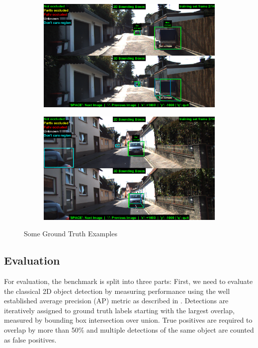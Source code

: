 \begin{figure}[h]
\begin{subfigure}{.5\textwidth}
\end{subfigure}
\begin{subfigure}{.5\textwidth}
    \centering
    \includegraphics[width=1.0\linewidth]{img/matlab/d3.png}
\end{subfigure}%
\begin{subfigure}{.5\textwidth}
    \centering
    \includegraphics[width=1.0\linewidth]{img/matlab/d4.png}
\end{subfigure}
\caption{Some Ground Truth Examples}
\end{figure}

\subsection{Evaluation}

For evaluation, the benchmark is split into three parts: 
First, we need to evaluate the classical
2D object detection by measuring performance using the
well established average precision (AP) metric as described
in \cite{everingham2010pascal}.
Detections are iteratively assigned to ground truth
labels starting with the largest overlap, measured by bounding
box intersection over union. 
True positives are required 
to overlap by more than 50\% and multiple detections
of the same object are counted as false positives. 

